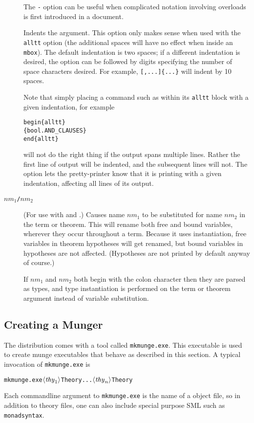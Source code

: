 \begin{description}
The \texttt{-} option can be useful when complicated notation involving overloads is first introduced in a document.

\item[\texttt{\indentoption}] Indents the argument.
%
  This option only makes sense when used with the \texttt{alltt} option (the additional spaces will have no effect when inside an \texttt{\bs{}mbox}).
%
  The default indentation is two spaces; if a different indentation is desired, the option can be followed by digits specifying the number of space characters desired.
%
  For example, \texttt{\holthm{}[,...]\{...\}} will indent by 10 spaces.

  Note that simply placing a command such as \holthm{} within its \texttt{alltt} block with a given indentation, for example
\begin{alltt}
   \bs{}begin\{alltt\}
      \holthm\{bool.AND_CLAUSES\}
   \bs{}end\{alltt\}
\end{alltt}
will not do the right thing if the output spans multiple lines.
%
Rather the first line of \HOL{} output will be indented, and the subsequent lines will not.
%
The \texttt{\indentoption} option lets the pretty-printer know that it is printing with a given indentation, affecting all lines of its output.


\item[$\mathit{nm}_1$\texttt{/}$\mathit{nm}_2$] (For use with \holtm{}
  and \holthm{}.)
%
Causes name $\mathit{nm}_1$ to be substituted for name $\mathit{nm}_2$ in the term or theorem.
%
This will rename both free and bound variables, wherever they occur throughout a term.
%
Because it uses instantiation, free variables in theorem hypotheses will get renamed, but bound variables in hypotheses are not affected.
%
(Hypotheses are not printed by default anyway of course.)

If $\mathit{nm}_1$ and $\mathit{nm}_2$ both begin with the colon character then they are parsed as types, and type instantiation is performed on the term or theorem argument instead of variable substitution.
\end{description}


\subsection{Creating a Munger}
\label{sec:munger-creation}

\newcommand{\mkmunge}{\texttt{mkmunge.exe}}
%
The \HOL{} distribution comes with a tool called \mkmunge.
%
This executable is used to create munge executables that behave as described in this section.
%
A typical invocation of \mkmunge{} is
\begin{alltt}
   \mkmunge \(\langle\mathit{thy}\sb{1}\rangle\)Theory ... \(\langle\mathit{thy}\sb{n}\rangle\)Theory
\end{alltt}
Each commandline argument to \mkmunge{} is the name of a \HOL{} object file, so in addition to theory files, one can also include special purpose SML such as \texttt{monadsyntax}.

